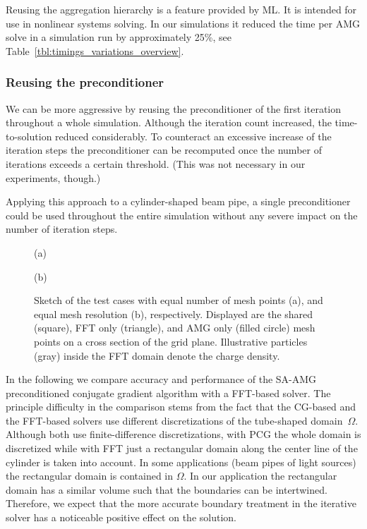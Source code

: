 Reusing the aggregation hierarchy is a feature provided by ML.  It is
intended for use in nonlinear systems solving.  In our simulations it
reduced the time per AMG solve in a simulation run by approximately
25\%, see Table~\ref{tbl:timings_variations_overview}.

\subsubsection*{Reusing the preconditioner}

We can be more aggressive by reusing the preconditioner of the first
iteration throughout a whole simulation.  Although the iteration count
increased, the time-to-solution reduced considerably.  To counteract an
excessive increase of the iteration steps the preconditioner can be
recomputed once the number of iterations exceeds a certain threshold.
(This was not necessary in our experiments, though.)

Applying this approach to a cylinder-shaped beam pipe, a single
preconditioner could be used throughout the entire simulation without
any severe impact on the number of iteration steps.

\begin{figure}[ht]
  \begin{minipage}[b]{0.5\textwidth}
    \centering
    

    (a)
  \end{minipage}
  \begin{minipage}[b]{0.5\textwidth}
    \centering
    

    (b)
  \end{minipage} 
  \caption{Sketch of the test cases with equal number of mesh points
    (a), and equal mesh resolution (b), respectively.  Displayed are the
    shared (square), FFT only (triangle), and AMG only (filled circle) mesh
    points on a cross section of the grid plane.  Illustrative particles
    (gray) inside the FFT domain denote the charge density.}

  \label{fig:meshcmp}
\end{figure}

In the following we compare accuracy and performance of the
SA-AMG preconditioned conjugate gradient algorithm with a FFT-based
solver.  The principle difficulty in the comparison stems from the fact
that the CG-based and the FFT-based solvers use different
discretizations of the tube-shaped domain~$\Omega$.  Although both use
finite-difference discretizations, with PCG the whole domain is
discretized while with FFT just a rectangular domain along the center
line of the cylinder is taken into account.  In some applications
(beam pipes of light sources) the rectangular domain is contained in $\Omega$.  In
our application the rectangular domain has a similar volume such that
the boundaries can be intertwined.  Therefore, we expect that the more
accurate boundary treatment in the iterative solver has a noticeable
positive effect on the solution.

